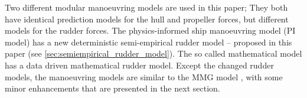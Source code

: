 Two different modular manoeuvring models are used in this paper; They both have identical prediction models for the hull and propeller forces, but different models for the rudder forces. The physics-informed ship manoeuvring model (PI model) has a new deterministic semi-empirical rudder model -- proposed in this paper (see \autoref{sec:semiempirical_rudder_model}). The so called mathematical model has a data driven mathematical rudder model. 
Except the changed rudder models, the manoeuvring models are similar to the MMG model \citep{yasukawa_introduction_2015}, with some minor enhancements that are presented in the next section.